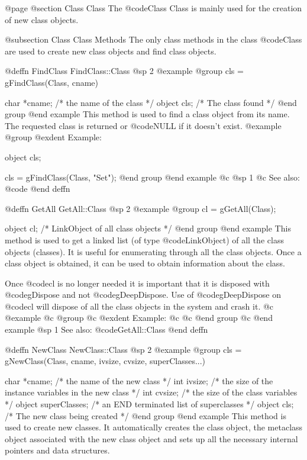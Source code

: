 @page
@section Class Class
The @code{Class} Class is mainly used for the creation of new class objects.


@subsection Class Class Methods
The only class methods in the class @code{Class} are used to create new
class objects and find class objects.







@deffn {FindClass} FindClass::Class
@sp 2
@example
@group
cls = gFindClass(Class, cname)

char    *cname; /*  the name of the class  */
object  cls;    /*  The class found        */
@end group
@end example
This method is used to find a class object from its name.  The requested
class is returned or @code{NULL} if it doesn't exist.
@example
@group
@exdent Example:

object  cls;

cls = gFindClass(Class, "Set");
@end group
@end example
@c @sp 1
@c See also:  @code{}
@end deffn







@deffn {GetAll} GetAll::Class
@sp 2
@example
@group
cl = gGetAll(Class);

object  cl;     /*  LinkObject of all class objects  */
@end group
@end example
This method is used to get a linked list (of type @code{LinkObject})
of all the class objects (classes).  It is useful for enumerating through
all the class objects.  Once a class object is obtained, it
can be used to obtain information about the class.

Once @code{cl} is no longer needed it is important that it is
disposed with @code{gDispose} and not @code{gDeepDispose}.  Use
of @code{gDeepDispose} on @code{cl} will dispose of all the class
objects in the system and crash it.
@c @example
@c @group
@c @exdent Example:
@c 
@c @end group
@c @end example
@sp 1
See also:  @code{GetAll::Class}
@end deffn









@deffn {NewClass} NewClass::Class
@sp 2
@example
@group
cls = gNewClass(Class, cname, ivsize, cvsize, superClasses...)

char    *cname; /*  the name of the new class    */
int     ivsize; /*  the size of the instance variables in 
                    the new class  */
int     cvsize; /*  the size of the class variables  */
object  superClasses;  /*  an END terminated list of 
                           superclasses  */
object  cls;    /*  The new class being created  */
@end group
@end example
This method is used to create new classes.  It automatically creates the
class object, the metaclass object associated with the new class object
and sets up all the necessary internal pointers and data structures.

